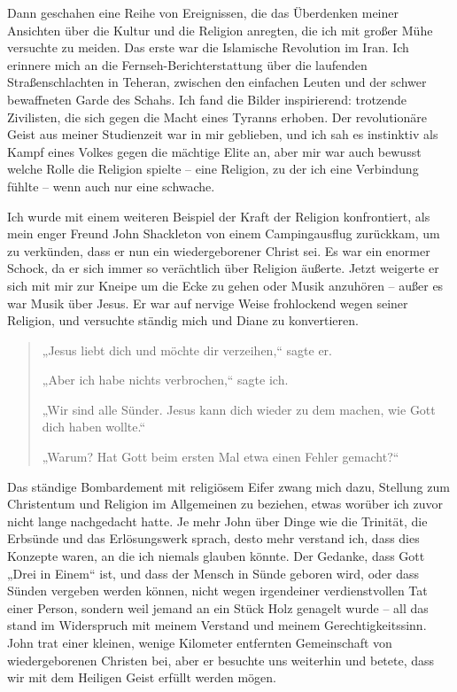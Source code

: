 \documentclass[12pt]{memoir}
\begin{document}
Dann geschahen eine Reihe von Ereignissen,
die das Überdenken meiner Ansichten über die Kultur und die Religion anregten,
die ich mit großer Mühe versuchte zu meiden.
Das erste war die Islamische Revolution im Iran.
Ich erinnere mich an die Fernseh-Berichterstattung
über die laufenden Straßenschlachten in Teheran,
zwischen den einfachen Leuten und der schwer bewaffneten Garde des Schahs.
Ich fand die Bilder inspirierend:
trotzende Zivilisten, die sich gegen die Macht eines Tyranns erhoben.
Der revolutionäre Geist aus meiner Studienzeit war in mir geblieben,
und ich sah es instinktiv als Kampf eines Volkes gegen die mächtige Elite an,
aber mir war auch bewusst welche Rolle die Religion spielte – eine Religion,
zu der ich eine Verbindung fühlte – wenn auch nur eine schwache.

Ich wurde mit einem weiteren Beispiel der Kraft der Religion konfrontiert,
als mein enger Freund John Shackleton von einem Campingausflug zurückkam,
um zu verkünden, dass er nun ein wiedergeborener Christ sei.
Es war ein enormer Schock,
da er sich immer so verächtlich über Religion äußerte.
Jetzt weigerte er sich mit mir zur Kneipe um die Ecke zu gehen
oder Musik anzuhören – außer es war Musik über Jesus.
Er war auf nervige Weise frohlockend wegen seiner Religion,
und versuchte ständig mich und Diane zu konvertieren.

\begin{quote}
„Jesus liebt dich und möchte dir verzeihen,“ sagte er.

„Aber ich habe nichts verbrochen,“ sagte ich.

„Wir sind alle Sünder.
Jesus kann dich wieder zu dem machen, wie Gott dich haben wollte.“

„Warum? Hat Gott beim ersten Mal etwa einen Fehler gemacht?“
\end{quote}

Das ständige Bombardement mit religiösem Eifer zwang mich dazu,
Stellung zum Christentum und Religion im Allgemeinen zu beziehen,
etwas worüber ich zuvor nicht lange nachgedacht hatte.
Je mehr John über Dinge wie die Trinität,
die Erbsünde und das Erlösungswerk sprach, desto mehr verstand ich,
dass dies Konzepte waren, an die ich niemals glauben könnte.
Der Gedanke, dass Gott „Drei in Einem“ ist,
und dass der Mensch in Sünde geboren wird,
oder dass Sünden vergeben werden können,
nicht wegen irgendeiner verdienstvollen Tat einer Person,
sondern weil jemand an ein Stück Holz genagelt wurde –
all das stand im Widerspruch mit meinem Verstand und meinem Gerechtigkeitssinn.
John trat einer kleinen,
wenige Kilometer entfernten Gemeinschaft von wiedergeborenen Christen bei,
aber er besuchte uns weiterhin und betete,
dass wir mit dem Heiligen Geist erfüllt werden mögen.
\end{document}
